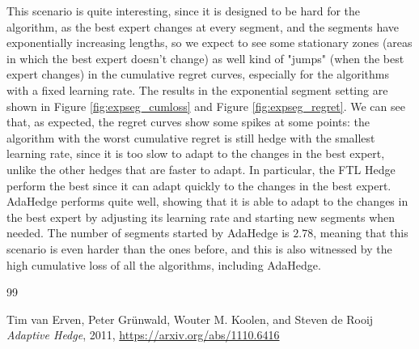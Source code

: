 \documentclass{article}
\begin{document}
This scenario is quite interesting, since it is designed to be hard for the algorithm, as the best expert changes at every segment, 
and the segments have exponentially increasing lengths, so we expect to see some stationary zones (areas in which the best expert doesn't change) as well kind of "jumps" (when the best expert changes) 
in the cumulative regret curves,
especially for the algorithms with a fixed learning rate. 
The results in the exponential segment setting are shown in Figure \ref{fig:expseg_cumloss} and Figure \ref{fig:expseg_regret}.
We can see that, as expected, the regret curves show some spikes at some points: the algorithm with the worst cumulative regret 
is still hedge with the smallest learning rate, since it is too slow to adapt to the changes in the best expert, unlike the other hedges
that are faster to adapt. In particular, the FTL Hedge perform the best since it can adapt quickly to the changes in the best expert. AdaHedge performs quite well, showing that it is able to adapt to the changes in the best expert by adjusting its learning rate and starting new segments when needed.
The number of segments started by AdaHedge is $2.78$, meaning that this scenario is even harder than the ones before, and this is also
witnessed by the high cumulative loss of all the algorithms, including AdaHedge.


\begin{thebibliography}{99}

Tim van Erven, Peter Grünwald, Wouter M. Koolen, and Steven de Rooij
{\em Adaptive Hedge}, 2011, \url{https://arxiv.org/abs/1110.6416}

\end{thebibliography}
\end{document}
